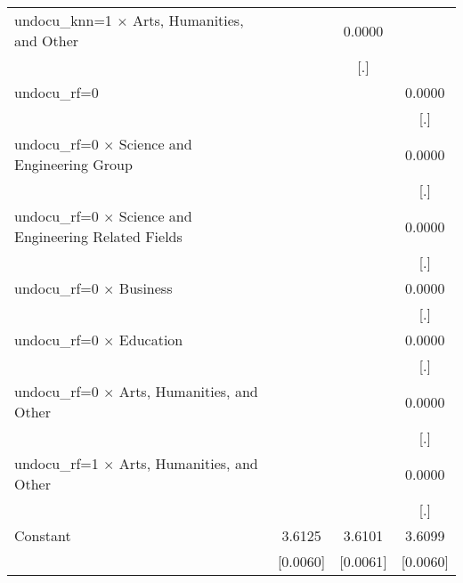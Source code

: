 \begin{table}[htbp]
\begin{tabular}{l*{3}{c}}
\addlinespace
undocu\_knn=1 $\times$ Arts, Humanities, and Other&                     &      0.0000         &                     \\
                    &                     &         [.]         &                     \\
\addlinespace
undocu\_rf=0         &                     &                     &      0.0000         \\
                    &                     &                     &         [.]         \\
\addlinespace
undocu\_rf=0 $\times$ Science and Engineering Group&                     &                     &      0.0000         \\
                    &                     &                     &         [.]         \\
\addlinespace
undocu\_rf=0 $\times$ Science and Engineering Related Fields&                     &                     &      0.0000         \\
                    &                     &                     &         [.]         \\
\addlinespace
undocu\_rf=0 $\times$ Business&                     &                     &      0.0000         \\
                    &                     &                     &         [.]         \\
\addlinespace
undocu\_rf=0 $\times$ Education&                     &                     &      0.0000         \\
                    &                     &                     &         [.]         \\
\addlinespace
undocu\_rf=0 $\times$ Arts, Humanities, and Other&                     &                     &      0.0000         \\
                    &                     &                     &         [.]         \\
\addlinespace
undocu\_rf=1 $\times$ Arts, Humanities, and Other&                     &                     &      0.0000         \\
                    &                     &                     &         [.]         \\
\addlinespace
Constant            &      3.6125\sym{***}&      3.6101\sym{***}&      3.6099\sym{***}\\
                    &    [0.0060]         &    [0.0061]         &    [0.0060]         \\

\end{tabular}
\end{table}
